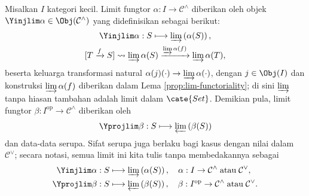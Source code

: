 \begin{proposition}\label{prop:lim-Yoneda}
	Misalkan $I$ kategori kecil. Limit fungtor $\alpha: I \to \mathcal{C}^\wedge$ diberikan oleh objek $\Yinjlim \alpha \in \Obj(\mathcal{C}^\wedge)$ yang didefinisikan sebagai berikut:
	\begin{gather*}
		\Yinjlim \alpha: S \longmapsto \varinjlim \left( \alpha(S) \right), \\
		[T \xrightarrow{f} S] \leadsto \varinjlim \alpha(S) \xrightarrow{\varinjlim \alpha(f)} \varinjlim \alpha(T),
	\end{gather*}
	beserta keluarga transformasi natural $\alpha(j)(\cdot) \to \varinjlim \alpha(\cdot)$, dengan $j \in \Obj(I)$ dan konstruksi $\varinjlim \alpha(f)$ diberikan dalam Lema \ref{prop:lim-functoriality}; di sini $\varinjlim$ tanpa hiasan tambahan adalah limit dalam $\cate{Set}$. Demikian pula, limit fungtor $\beta: I^\text{op} \to \mathcal{C}^\wedge$ diberikan oleh
	\[ \Yprojlim \beta: S \longmapsto \varprojlim \left( \beta(S) \right) \]
	dan data-data serupa. Sifat serupa juga berlaku bagi kasus dengan nilai dalam $\mathcal{C}^\vee$; secara notasi, semua limit ini kita tulis tanpa membedakannya sebagai
	\begin{align*}
		\Yinjlim \alpha: S & \longmapsto \varinjlim \left( \alpha(S) \right), \quad \alpha: I \to \mathcal{C}^\wedge \;\text{atau}\; \mathcal{C}^\vee, \\
		\Yprojlim \beta: S & \longmapsto \varprojlim \left( \beta(S) \right), \quad \beta: I^\text{op} \to \mathcal{C}^\wedge \;\text{atau}\; \mathcal{C}^\vee.
	\end{align*}
\end{proposition}
